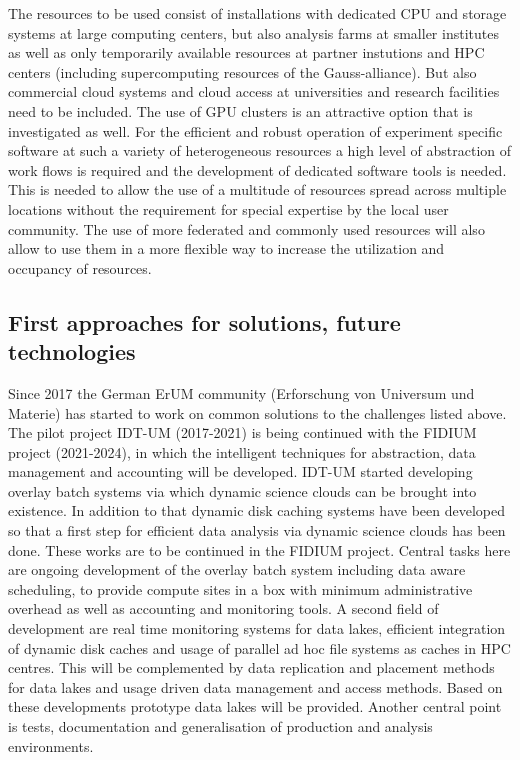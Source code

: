 The resources to be used consist of installations with dedicated CPU
and storage systems at large computing centers, but also analysis
farms at smaller institutes as well as only temporarily available
resources at partner instutions and HPC centers (including
supercomputing resources of the Gauss-alliance). But also commercial
cloud systems and cloud access at universities and research facilities
need to be included. The use of GPU clusters is an attractive option
that is investigated as well. For the efficient and robust operation
of experiment specific software at such a variety of heterogeneous
resources a high level of abstraction of work flows is required and
the development of dedicated software tools is needed. This is needed
to allow the use of a multitude of resources spread across multiple
locations without the requirement for special expertise by the local user
community. The use of more federated and commonly used resources will
also allow to use them in a more flexible way to increase the
utilization and occupancy of resources.

\subsection{First approaches for solutions, future technologies}
Since 2017 the German ErUM community (Erforschung von Universum
und
Materie) has started to work on common solutions to the challenges
listed above. The pilot project IDT-UM (2017-2021) is being continued
with the FIDIUM project (2021-2024), in which the intelligent
techniques for abstraction, data management and accounting will be
developed. IDT-UM started developing overlay batch systems via which dynamic science clouds
can be brought into existence. In addition to that dynamic disk caching systems have been
developed so that a first step for efficient data analysis via dynamic science clouds has been done.
These works are to be continued in the FIDIUM project. Central tasks here are
ongoing development of the overlay batch system including data aware scheduling, to provide 
compute sites in a box with minimum administrative overhead as well as accounting and monitoring tools.
A second field of development are real time monitoring systems for data lakes,
efficient integration of dynamic disk caches and usage of parallel ad hoc file systems as caches in HPC centres.
This will be complemented by data replication and placement methods for data lakes and usage
driven data management and access methods. Based on these developments prototype data lakes will be provided.
Another central point is tests, documentation and generalisation of production and analysis environments.

